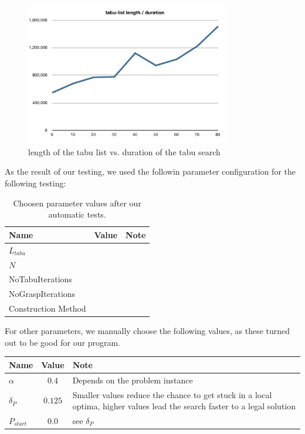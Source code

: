 \documentclass[a4paper,11pt]{article}
\begin{document}
\begin{figure}[htb]
  \begin{center}
    \includegraphics[width=0.8\textwidth]{images/tabulist-len-duration}
  \end{center}
  \caption{length of the tabu list vs. duration of the tabu search}
  \label{fig:tabu_len_cost}
\end{figure}

As the result of our testing, we used the followin parameter configuration for the following testing:

\begin{center}
  \begin{table}
    \begin{tabularx}{\linewidth}{| l | c | X | }
      \hline                       
      Name & Value & Note \\   \hline     \hline    
      $L_{tabu}$ &&  \\ \hline    
      $N$ &  &  \\ \hline   
      NoTabuIterations &   &\\ \hline  
      NoGraspIterations &   &  \\ \hline 
      Construction Method &   & \\ \hline 
    \end{tabularx}
    \caption{Choosen parameter values after our automatic tests.}
  \end{table}
\end{center}

For other parameters, we manually choose the following values, as these turned out to be good for our program.
\begin{center}
\begin{tabularx}{\linewidth}{| l | c | X | }
  \hline                       
  Name & Value & Note \\   \hline     \hline    
  $\alpha$ & $0.4$ & Depends on the problem instance \\ \hline    
  $ \delta_P $ & $ 0.125 $ & Smaller values reduce the chance to get stuck in a local optima, higher values lead the search faster to a legal solution \\ \hline    
  $P_{start}$ & $0.0$ & see $ \delta_P $ \\ \hline    
\end{tabularx}
\end{center}
\end{document}
